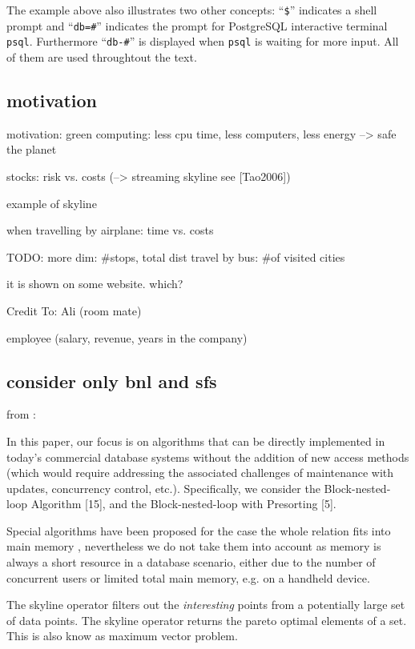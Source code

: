 The example above also illustrates two other concepts: ``\texttt{\$}''
indicates a shell prompt and ``\texttt{db=\#}'' indicates the prompt for
PostgreSQL interactive terminal \texttt{psql}. Furthermore
``\texttt{db-\#}'' is displayed when \texttt{psql} is waiting for more
input. All of them are used throughtout the text.

\subsection{motivation}
motivation: green computing: less cpu time, less computers, less
energy --> safe the planet

stocks: risk vs. costs (--> streaming skyline see [Tao2006])

example of skyline

when travelling by airplane: time vs. costs

TODO: more dim: \#stops, total dist
travel by bus: \#of visited cities

it is shown on some website. which?

Credit To: Ali (room mate)

employee (salary, revenue, years in the company)

\subsection{consider only bnl and sfs}

from \citep{Chaudhuri2006}:

In this paper, our focus is on algorithms that can be
directly implemented in today's commercial database systems
without the addition of new access methods (which
would require addressing the associated challenges of maintenance
with updates, concurrency control, etc.). Specifically,
we consider the Block-nested-loop Algorithm [15],
and the Block-nested-loop with Presorting [5].

Special algorithms have been proposed for the case the whole relation fits into main memory \citep{Preparata1985}, nevertheless we do not take them into account as memory is always a short resource in a database scenario, either due to the number of concurrent users or limited total main memory, e.g. on a handheld device.

The skyline operator \citep{Borzsonyi2001} filters out the \emph{interesting} points from a potentially large set of data points. The skyline operator returns the pareto optimal elements of a set. This is also know as maximum vector problem.

